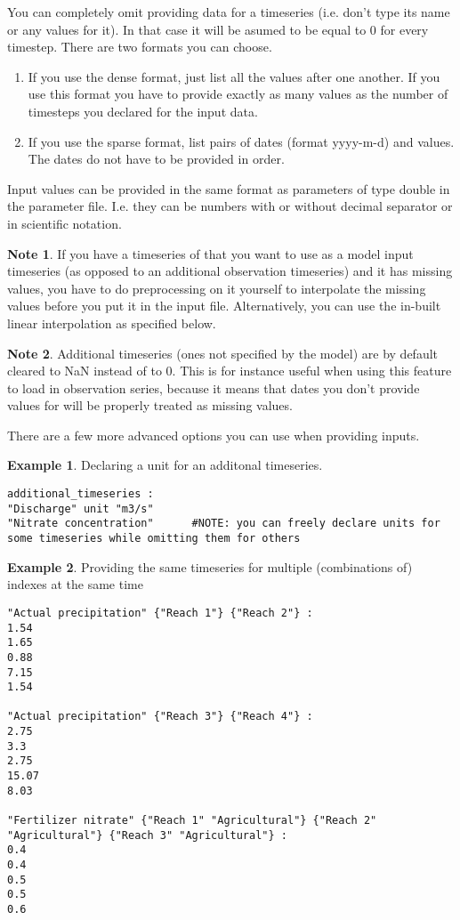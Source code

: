 \documentclass[11pt]{article}
\theoremstyle{definition}
\newtheorem{mynote}{Note}
\newenvironment{note}%
  {\begin{lrbox}{\notebox}%
   \begin{minipage}{\dimexpr\linewidth-2\fboxsep}
   \begin{mynote}}%
  {\end{mynote}%
   \end{minipage}%
   \end{lrbox}%
   \begin{trivlist}
     \item[]\colorbox{silver}{\usebox\notebox}
   \end{trivlist}}
\newtheorem{myexample}{Example}
\newenvironment{example}%
  {\begin{lrbox}{\examplebox}%
   \begin{minipage}{\dimexpr\linewidth-2\fboxsep}
   \begin{myexample}}%
  {\end{myexample}%
   \end{minipage}%
   \end{lrbox}%
   \begin{trivlist}
     \item[]\colorbox{silver}{\usebox\examplebox}
   \end{trivlist}}
\begin{document}
You can completely omit providing data for a timeseries (i.e. don't type its name or any values for it). In that case it will be asumed to be equal to 0 for every timestep. There are two formats you can choose.
\begin{enumerate}[i]
\item If you use the dense format, just list all the values after one another. If you use this format you have to provide exactly as many values as the number of timesteps you declared for the input data.
\item If you use the sparse format, list pairs of dates (format yyyy-m-d) and values. The dates do not have to be provided in order.
\end{enumerate}
Input values can be provided in the same format as parameters of type double in the parameter file. I.e. they can be numbers with or without decimal separator or in scientific notation.

\begin{note}
If you have a timeseries of that you want to use as a model input timeseries (as opposed to an additional observation timeseries) and it has missing values, you have to do preprocessing on it yourself to interpolate the missing values before you put it in the input file. Alternatively, you can use the in-built linear interpolation as specified below.
\end{note}

\begin{note}
Additional timeseries (ones not specified by the model) are by default cleared to NaN instead of to 0. This is for instance useful when using this feature to load in observation series, because it means that dates you don't provide values for will be properly treated as missing values.
\end{note}

There are a few more advanced options you can use when providing inputs.

\begin{example}\label{ex:declarewithunit}
Declaring a unit for an additonal timeseries.
\begin{lstlisting}
additional_timeseries :
"Discharge" unit "m3/s"
"Nitrate concentration"      #NOTE: you can freely declare units for some timeseries while omitting them for others
\end{lstlisting}
\end{example}

\begin{example}\label{ex:multiseries}
Providing the same timeseries for multiple (combinations of) indexes at the same time
\begin{lstlisting}
"Actual precipitation" {"Reach 1"} {"Reach 2"} :
1.54
1.65
0.88
7.15
1.54

"Actual precipitation" {"Reach 3"} {"Reach 4"} :
2.75
3.3
2.75
15.07
8.03

"Fertilizer nitrate" {"Reach 1" "Agricultural"} {"Reach 2" "Agricultural"} {"Reach 3" "Agricultural"} :
0.4
0.4
0.5
0.5
0.6
\end{lstlisting}
\end{example}
\end{document}

